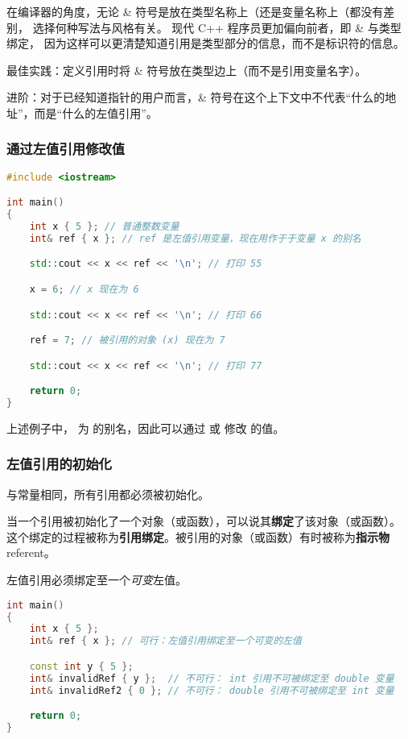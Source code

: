 \documentclass[../../LearnCpp.tex]{subfiles}
\begin{document}
在编译器的角度，无论 \& 符号是放在类型名称上（还是变量名称上（都没有差别，
选择何种写法与风格有关。
现代 C++ 程序员更加偏向前者，即 \& 与类型绑定，
因为这样可以更清楚知道引用是类型部分的信息，而不是标识符的信息。

最佳实践：定义引用时将 \& 符号放在类型边上（而不是引用变量名字）。

进阶：对于已经知道指针的用户而言，\& 符号在这个上下文中不代表“什么的地址”，而是“什么的左值引用”。

\subsubsection*{通过左值引用修改值}

\begin{lstlisting}[language=C++]
#include <iostream>

int main()
{
    int x { 5 }; // 普通整数变量
    int& ref { x }; // ref 是左值引用变量，现在用作于于变量 x 的别名

    std::cout << x << ref << '\n'; // 打印 55

    x = 6; // x 现在为 6

    std::cout << x << ref << '\n'; // 打印 66

    ref = 7; // 被引用的对象 (x) 现在为 7

    std::cout << x << ref << '\n'; // 打印 77

    return 0;
}
\end{lstlisting}

上述例子中， 为  的别名，因此可以通过  或  修改  的值。

\subsubsection*{左值引用的初始化}

与常量相同，所有引用都必须被初始化。

当一个引用被初始化了一个对象（或函数），可以说其\textbf{绑定}了该对象（或函数）。
这个绑定的过程被称为\textbf{引用绑定}。被引用的对象（或函数）有时被称为\textbf{指示物} referent。

左值引用必须绑定至一个\textit{可变}左值。

\begin{lstlisting}[language=C++]
int main()
{
    int x { 5 };
    int& ref { x }; // 可行：左值引用绑定至一个可变的左值

    const int y { 5 };
    int& invalidRef { y };  // 不可行： int 引用不可被绑定至 double 变量
    int& invalidRef2 { 0 }; // 不可行： double 引用不可被绑定至 int 变量

    return 0;
}
\end{lstlisting}
\end{document}
